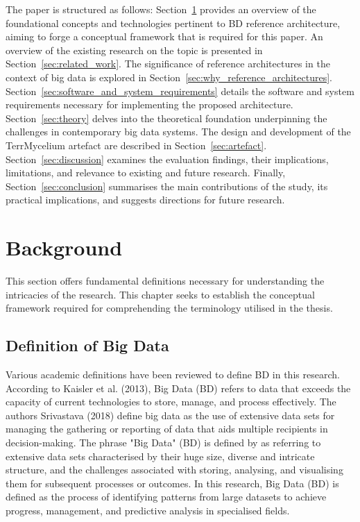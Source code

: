 \documentclass[journal]{IEEEtran}
\begin{document}
The paper is structured as follows: Section~\ref{sec:background} provides an overview of the foundational concepts and technologies pertinent to BD reference architecture, aiming to forge a conceptual framework that is required for this paper. An overview of the existing research on the topic is presented in Section~\ref{sec:related_work}. The significance of reference architectures in the context of big data is explored in Section~\ref{sec:why_reference_architectures}. Section~\ref{sec:software_and_system_requirements} details the software and system requirements necessary for implementing the proposed architecture. Section~\ref{sec:theory} delves into the theoretical foundation underpinning the challenges in contemporary big data systems. The design and development of the TerrMycelium artefact are described in Section~\ref{sec:artefact}. Section~\ref{sec:discussion} examines the evaluation findings, their implications, limitations, and relevance to existing and future research. Finally, Section~\ref{sec:conclusion} summarises the main contributions of the study, its practical implications, and suggests directions for future research.

\section{Background} \label{sec:background} 

This section offers fundamental definitions necessary for understanding the intricacies of the research. This chapter seeks to establish the conceptual framework required for comprehending the terminology utilised in the thesis. 

\subsection{Definition of Big Data} Various academic definitions have been reviewed to define BD in this research. According to Kaisler et al. (2013), Big Data (BD) refers to data that exceeds the capacity of current technologies to store, manage, and process effectively. The authors Srivastava (2018) define big data as the use of extensive data sets for managing the gathering or reporting of data that aids multiple recipients in decision-making. The phrase "Big Data" (BD) is defined by \cite{Sagiroglu2013} as referring to extensive data sets characterised by their huge size, diverse and intricate structure, and the challenges associated with storing, analysing, and visualising them for subsequent processes or outcomes. In this research, Big Data (BD) is defined as the process of identifying patterns from large datasets to achieve progress, management, and predictive analysis in specialised fields. 
\end{document}
